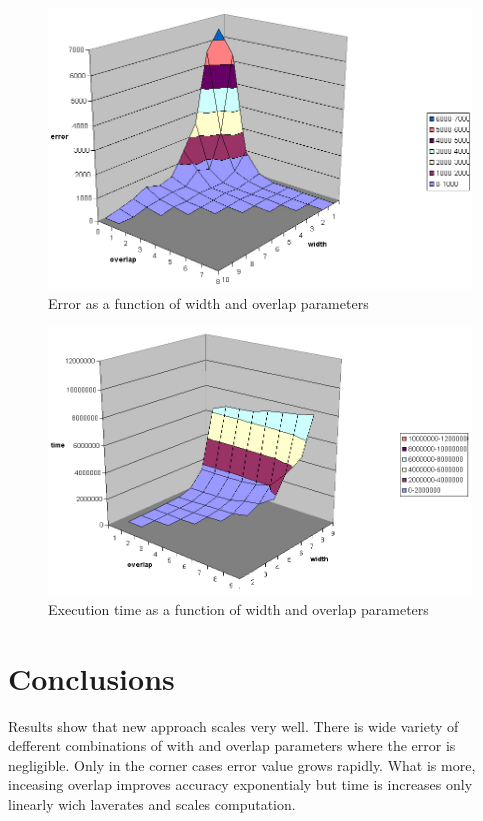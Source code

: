 \documentclass[]{spie}
\begin{document}
\begin{figure}[!htb]
\centering
\includegraphics[scale=0.4]{images/error}
\caption{Error as a function of width and overlap parameters}
\label{fig:error}
\end{figure}

\begin{figure}
\centering
\includegraphics[scale=0.4]{images/czas}
\caption{Execution time as a function of width and overlap parameters}
\label{fig:time}
\end{figure}

\section{Conclusions}

Results show that new approach scales very well.
There is wide variety of defferent combinations of with and overlap parameters where the error is negligible.
Only in the corner cases error value grows rapidly.
What is more, inceasing overlap improves accuracy exponentialy but time is increases only linearly wich laverates and scales computation.
\end{document}
